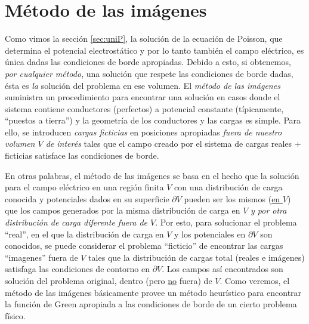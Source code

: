 \section{Método de las imágenes}
Como vimos la sección \ref{sec:uniP}, la solución de la ecuación de Poisson, que determina el potencial electrostático y por lo tanto también el campo eléctrico, es única dadas las condiciones de borde apropiadas. Debido a esto, si
obtenemos, \textit{por cualquier método}, una solución que respete las condiciones de
borde dadas, ésta es \textit{la} solución del problema en ese volumen. El \textit{método de
las imágenes} suministra un procedimiento para encontrar una solución en
casos donde el sistema contiene conductores (perfectos) a potencial constante
(típicamente, ``puestos a tierra'') y la geometría de los conductores y las
cargas es simple. Para ello, se introducen \textit{cargas ficticias} en
posiciones apropiadas \textit{fuera de nuestro volumen $V$ de interés} tales que el campo creado por el sistema de cargas reales
+ ficticias satisface las condiciones de borde.

En otras palabras, el método de las imágenes se basa en el hecho que la
solución para el campo eléctrico en una región finita $V$ con una
distribución de carga conocida y potenciales dados en su superficie
$\partial V$ pueden ser los mismos (\underline{en $V$}) que los campos generados por la
misma distribución de carga en $V$ \textit{y por otra distribución de carga
diferente fuera de $V$}. Por esto, para solucionar el problema ``real'', en el
que la distribución de carga en $V$ y los potenciales en $\partial V$ son conocidos, se
puede considerar el problema ``ficticio'' de encontrar las cargas ``imagenes''
fuera de $V$ tales que la distribución de cargas total (reales e imágenes)
satisfaga las condiciones de contorno en $\partial V$. Los campos así encontrados son
solución del problema original, dentro (pero \underline{no} fuera) de $V$. Como veremos, el método de las imágenes básicamente provee un método heurístico para encontrar la función de Green apropiada a las condiciones de borde de un cierto problema físico.



